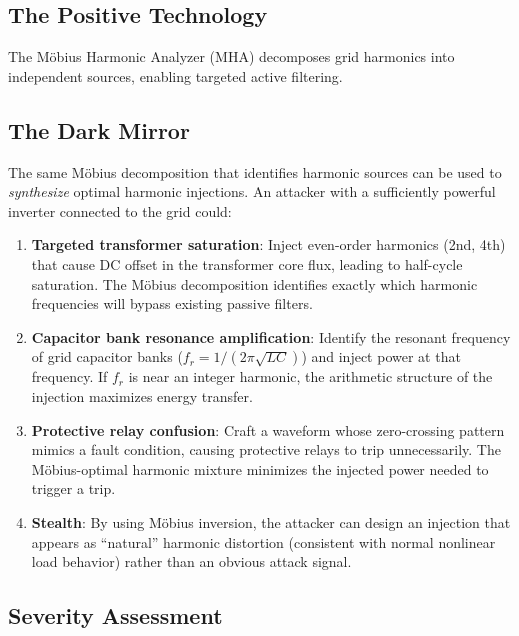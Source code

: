 \documentclass[11pt,a4paper]{article}
\begin{document}
\subsection{The Positive Technology}

The M\"obius Harmonic Analyzer (MHA) decomposes grid harmonics into
independent sources, enabling targeted active filtering.

\subsection{The Dark Mirror}

The same M\"obius decomposition that identifies harmonic sources
can be used to \emph{synthesize} optimal harmonic injections. An
attacker with a sufficiently powerful inverter connected to the
grid could:

\begin{enumerate}
  \item \textbf{Targeted transformer saturation}: Inject
    even-order harmonics (2nd, 4th) that cause DC offset in the
    transformer core flux, leading to half-cycle saturation.
    The M\"obius decomposition identifies exactly which harmonic
    frequencies will bypass existing passive filters.

  \item \textbf{Capacitor bank resonance amplification}: Identify
    the resonant frequency of grid capacitor banks
    ($f_r = 1/(2\pi\sqrt{LC})$) and inject power at that frequency.
    If $f_r$ is near an integer harmonic, the arithmetic structure
    of the injection maximizes energy transfer.

  \item \textbf{Protective relay confusion}: Craft a waveform whose
    zero-crossing pattern mimics a fault condition, causing
    protective relays to trip unnecessarily. The M\"obius-optimal
    harmonic mixture minimizes the injected power needed to trigger
    a trip.

  \item \textbf{Stealth}: By using M\"obius inversion, the attacker
    can design an injection that appears as ``natural'' harmonic
    distortion (consistent with normal nonlinear load behavior)
    rather than an obvious attack signal.
\end{enumerate}

\subsection{Severity Assessment}
\end{document}
